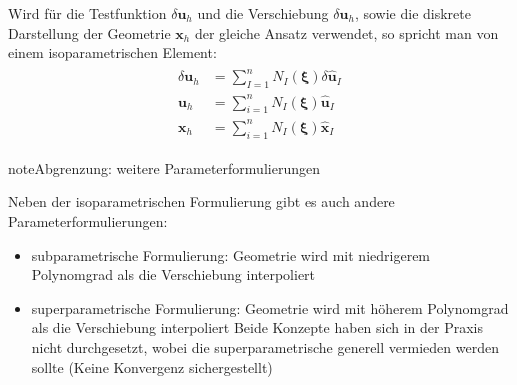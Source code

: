 \documentclass[letterpaper,10pt,german]{jupyterBook}
\begin{document}
\sphinxAtStartPar
Wird für die Testfunktion \(\delta \bm{u}_h\) und die Verschiebung \(\delta\bm{u}_h\), sowie die diskrete Darstellung der Geometrie \(\bm{x}_h\) der gleiche Ansatz verwendet, so spricht man von einem isoparametrischen Element:
\begin{equation}\label{equation:chapters/chapter3/isoparametrischeFEM:isoparametric}
\begin{split}\begin{align}
  \delta \bm{u}_h &= \sum_{I=1}^{n} N_I(\bm{\xi}) \delta \hat{\bm{u}}_I \\
  \bm{u}_h &= \sum_{i=1}^{n} N_I(\bm{\xi}) \hat{\bm{u}}_I \\
  \bm{x}_h &= \sum_{i=1}^{n} N_I(\bm{\xi}) \hat{\bm{x}}_I
\end{align}\end{split}
\end{equation}
\begin{sphinxadmonition}{note}{Abgrenzung: weitere Parameterformulierungen}

\sphinxAtStartPar
Neben der isoparametrischen Formulierung gibt es auch andere Parameterformulierungen:
\begin{itemize}
\item {} 
\sphinxAtStartPar
subparametrische Formulierung: Geometrie wird mit niedrigerem Polynomgrad als die Verschiebung interpoliert

\item {} 
\sphinxAtStartPar
superparametrische Formulierung: Geometrie wird mit höherem Polynomgrad als die Verschiebung interpoliert
Beide Konzepte haben sich in der Praxis nicht durchgesetzt, wobei die superparametrische generell vermieden werden sollte (Keine Konvergenz sichergestellt)

\end{itemize}
\end{sphinxadmonition}
\end{document}
